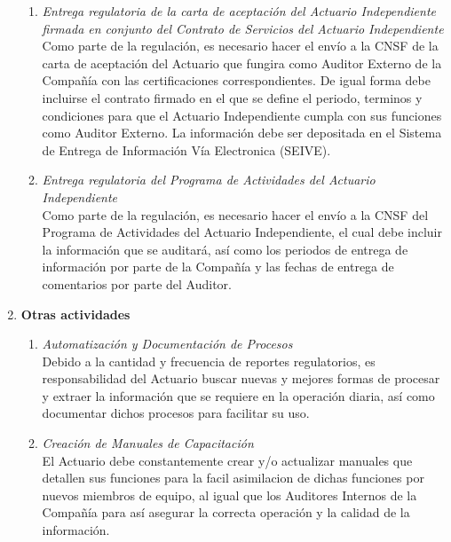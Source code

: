 \documentclass[11pt,twoside,openright,spanish]{report}
\numberwithin{equation}{chapter}
\numberwithin{figure}{chapter}
\numberwithin{table}{chapter}
\begin{document}
\begin{singlespace}
\begin{enumerate}
\begin{enumerate}
			\item \textit{Entrega regulatoria de la carta de aceptación del Actuario Independiente firmada en conjunto del Contrato de Servicios del Actuario Independiente} \\ \-\hspace{0.5cm}
			Como parte de la regulación, es necesario hacer el envío a la CNSF de la carta de aceptación del Actuario que fungira como Auditor Externo de la Compañía con las certificaciones correspondientes. De igual forma debe incluirse el contrato firmado en el que se define el periodo, terminos y condiciones para que el Actuario Independiente cumpla con sus funciones como Auditor Externo. La información debe ser depositada en el Sistema de Entrega de Información Vía Electronica (SEIVE).
			\item \textit{Entrega regulatoria del Programa de Actividades del Actuario Independiente} \\ \-\hspace{0.5cm}
			Como parte de la regulación, es necesario hacer el envío a la CNSF del Programa de Actividades del Actuario Independiente, el cual debe incluir la información que se auditará, así como los periodos de entrega de información por parte de la Compañía y las fechas de entrega de comentarios por parte del Auditor. 
		\end{enumerate}
		\item \textbf{Otras actividades}
		\begin{enumerate}
			\item \textit{Automatización y Documentación de Procesos} \\ \-\hspace{0.5cm}
			Debido a la cantidad y frecuencia de reportes regulatorios, es responsabilidad del Actuario buscar nuevas y mejores formas de procesar y extraer la información que se requiere en la operación diaria, así como documentar dichos procesos para facilitar su uso.
			\item \textit{Creación de Manuales de Capacitación} \\ \-\hspace{0.5cm}
			El Actuario debe constantemente crear y/o actualizar manuales que detallen sus funciones para la facil asimilacion de dichas funciones por nuevos miembros de equipo, al igual que los Auditores Internos de la Compañía para así asegurar la correcta operación y la calidad de la información.
		\end{enumerate}
	\end{enumerate}
\end{singlespace}
\end{document}
